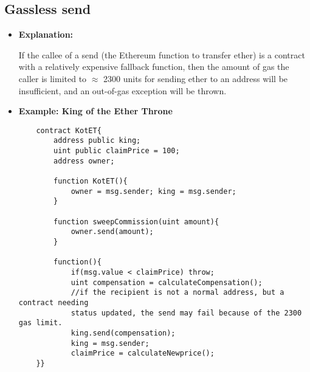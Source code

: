 \documentclass{llncs}
\begin{document}
\subsection{Gassless send}
\begin{itemize}
\item \textbf{Explanation:} 

If the callee of a send (the Ethereum function to transfer ether) is a contract with a relatively expensive fallback function, then the amount of gas the caller is limited to $ \approx $ 2300 units for sending ether to an address will be insufficient, and an out-of-gas exception will be thrown.

\item \textbf{Example: King of the Ether Throne}

	\begin{minipage}{.5\textwidth} 
	{\scriptsize
	\begin{verbatim}
	contract KotET{
	    address public king;
	    uint public claimPrice = 100;
	    address owner;
	    
	    function KotET(){
	        owner = msg.sender; king = msg.sender;
	    }
	    
	    function sweepCommission(uint amount){
	        owner.send(amount);
	    }
	    
	    function(){
	        if(msg.value < claimPrice) throw;
	        uint compensation = calculateCompensation();
	        //if the recipient is not a normal address, but a contract needing 
	        status updated, the send may fail because of the 2300 gas limit. 
	        king.send(compensation);
	        king = msg.sender;
	        claimPrice = calculateNewprice();
	}}
	\end{verbatim} }
	
	\end{minipage}

\end{itemize}
\end{document}
